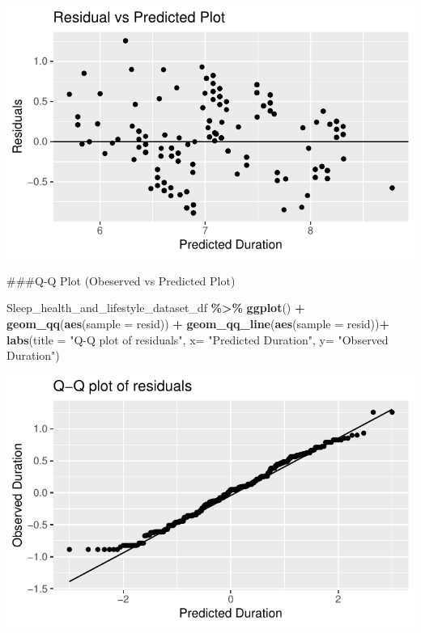 \documentclass[
  11pt,
]{article}
\newenvironment{Shaded}{\begin{snugshade}}{\end{snugshade}}
\newcommand{\AttributeTok}[1]{\textcolor[rgb]{0.13,0.29,0.53}{#1}}
\newcommand{\FunctionTok}[1]{\textcolor[rgb]{0.13,0.29,0.53}{\textbf{#1}}}
\newcommand{\NormalTok}[1]{#1}
\newcommand{\SpecialCharTok}[1]{\textcolor[rgb]{0.81,0.36,0.00}{\textbf{#1}}}
\newcommand{\StringTok}[1]{\textcolor[rgb]{0.31,0.60,0.02}{#1}}
\begin{document}
\begin{center}\includegraphics[width=0.7\linewidth]{SleepHelath_files/figure-latex/unnamed-chunk-36-1} \end{center}

\#\#\#Q-Q Plot (Obeserved vs Predicted Plot)

\begin{Shaded}
\begin{Highlighting}[]
\NormalTok{Sleep\_health\_and\_lifestyle\_dataset\_df }\SpecialCharTok{\%\textgreater{}\%}
  \FunctionTok{ggplot}\NormalTok{() }\SpecialCharTok{+}
  \FunctionTok{geom\_qq}\NormalTok{(}\FunctionTok{aes}\NormalTok{(}\AttributeTok{sample =}\NormalTok{ resid)) }\SpecialCharTok{+}
  \FunctionTok{geom\_qq\_line}\NormalTok{(}\FunctionTok{aes}\NormalTok{(}\AttributeTok{sample =}\NormalTok{ resid))}\SpecialCharTok{+}
  \FunctionTok{labs}\NormalTok{(}\AttributeTok{title =} \StringTok{"Q{-}Q plot of residuals"}\NormalTok{, }\AttributeTok{x=} \StringTok{"Predicted Duration"}\NormalTok{, }\AttributeTok{y=} \StringTok{"Observed Duration"}\NormalTok{)}
\end{Highlighting}
\end{Shaded}

\begin{center}\includegraphics[width=0.7\linewidth]{SleepHelath_files/figure-latex/unnamed-chunk-37-1} \end{center}
\end{document}

